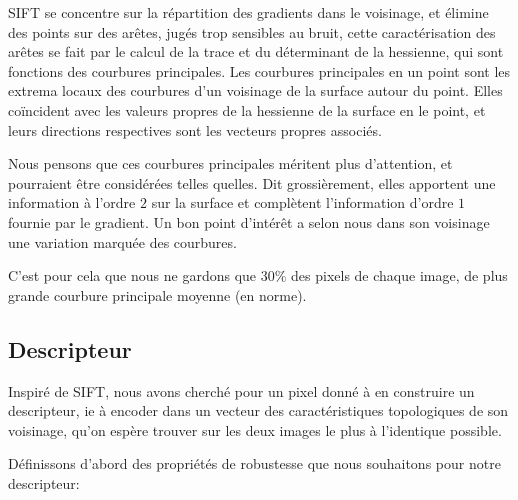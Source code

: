 \documentclass[
	a4paper, %
	10pt, %
	unnumberedsections, %
	twoside, %
]{LTJournalArticle}
\begin{document}
SIFT se concentre sur la répartition des gradients
dans le voisinage, et élimine des points sur des arêtes, jugés trop
sensibles au bruit, cette caractérisation des arêtes se fait par
le calcul de la trace et du déterminant de la hessienne,
qui sont fonctions des courbures principales.
Les courbures principales en un point sont les extrema locaux des courbures d'un voisinage de la surface
autour du point. Elles
coïncident avec les valeurs propres de la hessienne de la surface en le point,
et leurs directions respectives sont les vecteurs propres associés.

Nous pensons que ces courbures principales méritent plus d'attention,
et pourraient être considérées telles quelles. Dit grossièrement,
elles apportent une information à l'ordre $2$ sur la surface et complètent
l'information d'ordre $1$ fournie par le gradient. Un bon
point d'intérêt a selon nous dans son voisinage une variation marquée des courbures.


C'est pour cela que nous ne gardons que $30 \%$ des pixels de chaque image,
de plus grande courbure principale moyenne (en norme).

\subsection{Descripteur}
Inspiré de SIFT, nous avons cherché pour un pixel donné à en construire un descripteur,
ie à encoder dans un vecteur des caractéristiques topologiques de son voisinage, qu'on espère trouver
sur les deux images le plus à l'identique possible.

Définissons d'abord des propriétés de robustesse
que nous souhaitons pour notre descripteur:
\end{document}
